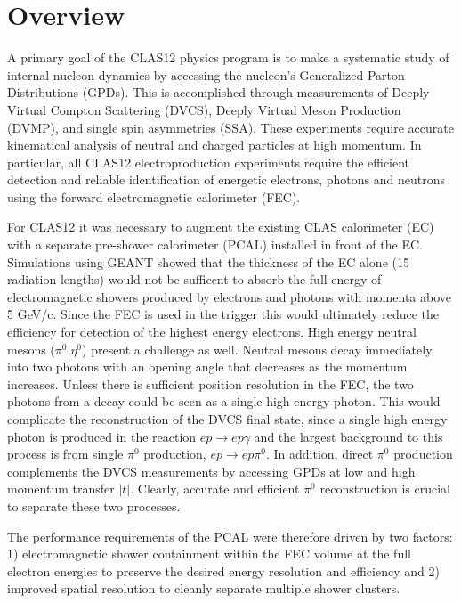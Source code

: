 \section{Overview}

A primary goal of the CLAS12 physics program is to make a systematic study of internal nucleon dynamics by accessing the nucleon's Generalized Parton Distributions (GPDs). This is accomplished through measurements of Deeply Virtual Compton Scattering (DVCS), Deeply Virtual Meson Production (DVMP), and single spin asymmetries (SSA). These experiments require accurate kinematical analysis of neutral and charged particles at high momentum. In particular, all CLAS12 electroproduction experiments require the efficient detection and reliable identification of energetic electrons, photons and neutrons using the forward electromagnetic calorimeter (FEC).

For CLAS12 it was necessary to augment the existing CLAS calorimeter (EC) \cite{clas6nim} with a separate pre-shower calorimeter (PCAL) installed in front of the EC.  Simulations using GEANT showed that the thickness of the EC alone (15 radiation lengths) would not be sufficent to absorb the full energy of electromagnetic showers produced by electrons and photons with momenta above 5 GeV/c. Since the FEC is used in the trigger this would ultimately reduce the efficiency for detection of the highest energy electrons.  High energy neutral mesons ($\pi^{0}$,$\eta^{0}$) present a challenge as well. Neutral mesons decay immediately into two photons with an opening angle that decreases as the momentum increases. Unless there is sufficient position resolution in the FEC, the two photons from a decay could be seen as a single high-energy photon.  This would complicate the reconstruction of the DVCS final state, since a single high energy photon is produced in the reaction $ep \to ep\gamma$ and the largest background to this process is from single $\pi^{0}$ production, $ep \to ep\pi^{0}$.  In addition, direct $\pi^{0}$ production complements the DVCS measurements by accessing GPDs at low and high momentum transfer $|t|$. Clearly, accurate and efficient $\pi^{0}$ reconstruction is crucial to separate these two processes. 

The performance requirements of the PCAL were therefore driven by two factors: 1) electromagnetic shower containment within the FEC volume at the full electron energies to preserve the desired energy resolution and efficiency and 2) improved spatial resolution to cleanly separate multiple shower clusters.  




